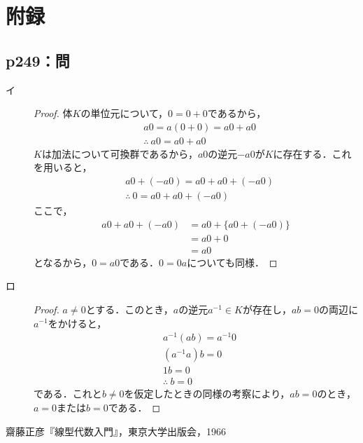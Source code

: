 \documentclass[uplatex,dvipdfmx,a4paper,10pt,fleqn]{jsarticle}
\begin{document}
\section*{附録\three}


\subsection*{p249：問}

\begin{tleftbar}
\begin{description}
    \item[イ] 
	\begin{proof}
		体$K$の単位元について，$0=0+0$であるから，
		\begin{align*}
			&a 0=a(0+0)=a0 + a0\\
			&\therefore ~ a0 = a0 + a0
		\end{align*}
		$K$は加法について可換群であるから，$a0$の逆元$-a0$が$K$に存在する．これを用いると，
\begin{align*}
	&a0 + (-a0) = a0 + a0 + (-a0) \\
	&\therefore ~ 0 = a0 + a0 +(-a0)
\end{align*}
 ここで，
 \begin{align*}
	a0 + a0 +(-a0)&=a0+ \{a0+(-a0)\} \\
	& = a0 + 0 \\
	& = a0
 \end{align*}
となるから，$0=a0$である．$0=0a$についても同様．
\end{proof}
\item[ロ]
\begin{proof}
        $a \ne 0$とする．このとき，$a$の逆元$a^{-1} \in K$が存在し，$ab=0$の両辺に$a^{-1}$をかけると，
        \begin{align*}
            &a^{-1} (ab) = a^{-1} 0 \\
            &(a^{-1}a)b =0 \\
            &1b =0 \\
            &\therefore~ b=0
        \end{align*}
        である．これと$b \ne 0$を仮定したときの同様の考察により，$ab=0$のとき，$a=0$または$b=0$である．
    \end{proof}
    \end{description}
\end{tleftbar}

\begin{thebibliography}{9}
	 齋藤正彦『線型代数入門』，東京大学出版会，1966
\end{thebibliography}
\end{document}
